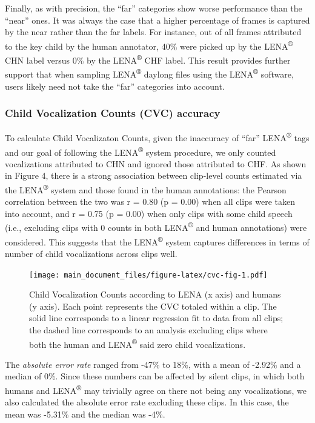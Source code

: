 \documentclass[english,table,man,floatsintext]{apa6}
\begin{document}
Finally, as with precision, the \enquote{far} categories show worse performance than the \enquote{near} ones. It was always the case that a higher percentage of frames is captured by the near rather than the far labels. For instance, out of all frames attributed to the key child by the human annotator, 40\% were picked up by the LENA\textsuperscript{®} CHN label versus 0\% by the LENA\textsuperscript{®} CHF label. This result provides further support that when sampling LENA\textsuperscript{®} daylong files using the LENA\textsuperscript{®} software, users likely need not take the \enquote{far} categories into account.

\hypertarget{child-vocalization-counts-cvc-accuracy}{%
\subsubsection{Child Vocalization Counts (CVC) accuracy}\label{child-vocalization-counts-cvc-accuracy}}

To calculate Child Vocalizaton Counts, given the inaccuracy of \enquote{far} LENA\textsuperscript{®} tags and our goal of following the LENA\textsuperscript{®} system procedure, we only counted vocalizations attributed to CHN and ignored those attributed to CHF. As shown in Figure 4, there is a strong association between clip-level counts estimated via the LENA\textsuperscript{®} system and those found in the human annotations: the Pearson correlation between the two was r = 0.80 (p = 0.00) when all clips were taken into account, and r = 0.75 (p = 0.00) when only clips with some child speech (i.e., excluding clips with 0 counts in both LENA\textsuperscript{®} and human annotations) were considered. This suggests that the LENA\textsuperscript{®} system captures differences in terms of number of child vocalizations across clips well.

\begin{figure}
\centering
\texttt{[image: main\_document\_files/figure-latex/cvc-fig-1.pdf]}
\caption{\label{fig:cvc-fig}Child Vocalization Counts according to LENA (x axis) and humans (y axis). Each point represents the CVC totaled within a clip. The solid line corresponds to a linear regression fit to data from all clips; the dashed line corresponds to an analysis excluding clips where both the human and LENA\textsuperscript{®} said zero child vocalizations.}
\end{figure}

The \emph{absolute error rate} ranged from -47\% to 18\%, with a mean of -2.92\% and a median of 0\%. Since these numbers can be affected by silent clips, in which both humans and LENA\textsuperscript{®} may trivially agree on there not being any vocalizations, we also calculated the absolute error rate excluding these clips. In this case,
the mean was -5.31\% and the median was -4\%.
\end{document}
